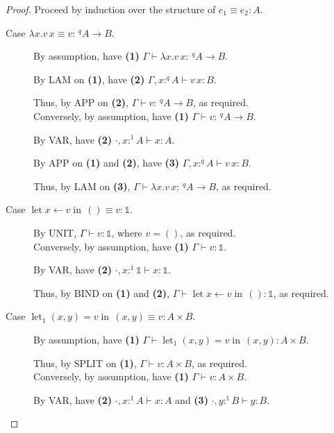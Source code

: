 \documentclass[acmsmall,screen,nonacm]{acmart}
\DeclareMathOperator{\llet}{\text{let}}
\DeclareMathOperator{\lin}{\text{in}}
\newcommand{\unit}{\mathbb{1}}
\newcommand{\tee}{\vdash}
\begin{document}
\begin{proof}
  Proceed by induction over the structure of $e_1 \equiv e_2 : A$.
  \begin{description}
    \item[Case $\lambda x.v \, x \equiv v : \,^q A \rightarrow B$.]
    By assumption, have \textbf{(1)} $\Gamma \tee \lambda x.v \, x : \,^q A \rightarrow B$.
    
    By LAM on \textbf{(1)}, have \textbf{(2)} $\Gamma, x :^q A \tee v \, x : B$.
    
    Thus, by APP on \textbf{(2)}, $\Gamma \tee v : \,^q A \rightarrow B$, as required.
    \\
    
    Conversely, by assumption, have \textbf{(1)} $\Gamma \tee v : \,^q A \rightarrow B$.

    By VAR, have \textbf{(2)} $\cdot, x :^1 A \tee x : A$.

    By APP on \textbf{(1)} and \textbf{(2)}, have \textbf{(3)} $\Gamma, x :^q A \tee v \, x : B$.
    
    Thus, by LAM on \textbf{(3)}, $\Gamma \tee \lambda x.v \, x : \,^q A \rightarrow B$, as required.
    \\
    \item[Case $\llet x \leftarrow v \lin \, () \equiv v : \unit$.]
    By UNIT, $\Gamma \tee v : \unit$, where $v = ()$, as required.
    \\

    Conversely, by assumption, have \textbf{(1)} $\Gamma \tee v : \unit$.
    
    By VAR, have \textbf{(2)} $\cdot, x :^1 \unit \tee x : \unit$.

    Thus, by BIND on \textbf{(1)} and \textbf{(2)}, $\Gamma \tee \llet x \leftarrow v \lin \, () : \unit$, as required.
    \\
    \item[Case $\llet_1 (x, y) = v \lin \, (x, y) \equiv v : A \times B$.]
    By assumption, have \textbf{(1)} $\Gamma \tee \llet_1 (x, y) = v \lin \, (x, y) : A \times B$.
    
    Thus, by SPLIT on \textbf{(1)}, $\Gamma \tee v : A \times B$, as required.
    \\

    Conversely, by assumption, have \textbf{(1)} $\Gamma \tee v : A \times B$.

    By VAR, have \textbf{(2)} $\cdot, x :^1 A \tee x : A$ and \textbf{(3)} $\cdot, y :^1 B \tee y : B$.


\end{description}
\end{proof}
\end{document}
